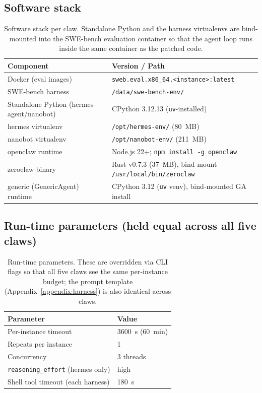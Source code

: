 \documentclass{llmxive}
\begin{document}
\subsection{Software stack}

\begin{table}[!htbp]
\centering
\small
\begin{tabular}{ll}
\toprule
\textbf{Component} & \textbf{Version / Path} \\
\midrule
Docker (eval images)               & \texttt{sweb.eval.x86\_64.<instance>:latest} \\
SWE-bench harness                  & \texttt{/data/swe-bench-env/} \\
Standalone Python (hermes-agent/nanobot) & CPython 3.12.13 (\texttt{uv}-installed) \\
hermes virtualenv                  & \texttt{/opt/hermes-env/} (80~MB) \\
nanobot virtualenv                 & \texttt{/opt/nanobot-env/} (211~MB) \\
openclaw runtime                   & Node.js 22+; \texttt{npm install -g openclaw} \\
zeroclaw binary                    & Rust v0.7.3 (37~MB), bind-mount \texttt{/usr/local/bin/zeroclaw} \\
generic (GenericAgent) runtime     & CPython 3.12 (\texttt{uv} venv), bind-mounted GA install \\
\bottomrule
\end{tabular}
\caption{Software stack per claw. Standalone Python and the harness virtualenvs
are bind-mounted into the SWE-bench evaluation container so that the agent loop
runs inside the same container as the patched code.}
\label{tab:appx-d-software}
\end{table}

\subsection{Run-time parameters (held equal across all five claws)}

\begin{table}[!htbp]
\centering
\small
\begin{tabular}{ll}
\toprule
\textbf{Parameter} & \textbf{Value} \\
\midrule
Per-instance timeout                                & 3600~s (60~min) \\
Repeats per instance                                & 1 \\
Concurrency                                         & 3 threads \\
\texttt{reasoning\_effort} (hermes only)            & high \\
Shell tool timeout (each harness)                   & 180~s \\
\bottomrule
\end{tabular}
\caption{Run-time parameters. These are overridden via CLI flags so that all five
claws see the same per-instance budget; the prompt template
(Appendix~\ref{appendix:harness}) is also identical across claws.}
\label{tab:appx-d-runtime}
\end{table}
\end{document}
